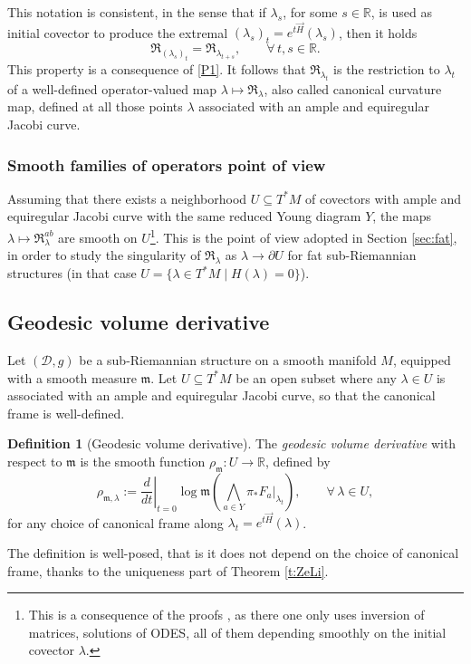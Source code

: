 \documentclass[11pt,a4paper]{article}
\theoremstyle{plain}
\theoremstyle{definition}
\newtheorem{definition}[theorem]{Definition}
\theoremstyle{remark}
\numberwithin{equation}{section}
\newcommand{\R}{\mathbb{R}} %
\newcommand{\distr}{\mathscr{D}}
\newcommand{\mm}{\mathfrak m}
\begin{document}
This notation is consistent, in the sense that if $\lambda_s$, for some $s\in \R$, is used as initial covector to produce the extremal $(\lambda_s)_t = e^{t\vec{H}}(\lambda_s)$, then it holds
\begin{equation}
\mathfrak{R}_{(\lambda_s)_t} = \mathfrak{R}_{\lambda_{t+s}}, \qquad \forall\, t,s\in \R.
\end{equation}
This property is a consequence of \ref{P1}. It follows that $\mathfrak{R}_{\lambda_t}$ is the restriction to $\lambda_t$ of a well-defined operator-valued map $\lambda \mapsto \mathfrak{R}_{\lambda}$, also called canonical curvature map, defined at all those points $\lambda$ associated with an ample and equiregular Jacobi curve.

\subsubsection{Smooth families of operators point of view}\label{sec:can-operators}
Assuming that there exists a neighborhood $U\subseteq T^*M$ of covectors with ample and equiregular Jacobi curve with the same reduced Young diagram $Y$, the maps $\lambda \mapsto \mathfrak{R}_{\lambda}^{ab}$ are smooth on $U$\footnote{This is a consequence of the proofs \cite{ZeLi}, as there one only uses inversion of matrices, solutions of ODES, all of them depending smoothly on the initial covector $\lambda$.}. This is the point of view adopted in Section \ref{sec:fat}, in order to study the singularity of $\mathfrak{R}_{\lambda}$ as $\lambda \to \partial U$ for fat sub-Riemannian structures (in that case $U= \{ \lambda \in T^*M \mid H(\lambda)=0\}$).




\subsection{Geodesic volume derivative} \label{sec:gvd}

Let $(\distr,g)$ be a sub-Riemannian structure on a smooth manifold $M$, equipped with a smooth measure $\mm$. Let $U\subseteq T^*M$ be an open subset where any $\lambda \in U$ is associated with an ample and equiregular Jacobi curve, so that the canonical frame is well-defined.

\begin{definition}[Geodesic volume derivative] The \emph{geodesic volume derivative} with respect to $\mm$ is the smooth function $\rho_{\mm}:U \to \R$, defined by
\begin{equation}
\rho_{\mm,\lambda} := \left.\frac{d}{dt}\right|_{t=0}\log\mm\left(\bigwedge_{a\in Y} \pi_* F_a|_{\lambda_t}\right), \qquad \forall\, \lambda \in U,
\end{equation}
for any choice of canonical frame along $\lambda_t=e^{t\vec{H}}(\lambda)$.
\end{definition}
The definition is well-posed, that is it does not depend on the choice of canonical frame, thanks to the uniqueness part of Theorem \ref{t:ZeLi}.
\end{document}
